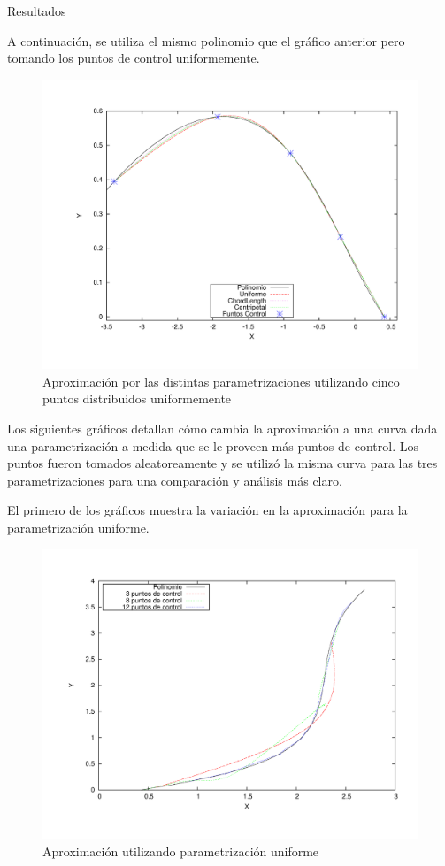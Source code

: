 \begin{section}{Resultados}
	\VSP
	
	A continuación, se utiliza el mismo polinomio que el gráfico anterior pero tomando los puntos de control uniformemente.
	
	\begin{figure}[H]
	  \centering
		\includegraphics[width=14cm]{graficos/5p_u.pdf}
	  \caption{Aproximación por las distintas parametrizaciones utilizando cinco puntos distribuidos uniformemente}
	  \label{fig:5p_u}
	\end{figure}
	
	\VSP

	Los siguientes gráficos detallan cómo cambia la aproximación a una curva dada una parametrización a medida que se le proveen más puntos de control. 
	Los puntos fueron tomados aleatoreamente y se utilizó la misma curva para las tres parametrizaciones para una comparación y análisis más claro.
		
	El primero de los gráficos muestra la variación en la aproximación para la parametrización uniforme.
		
	\begin{figure}[H]
	  \centering
		\includegraphics[width=14cm]{graficos/uniform_grafiquinSame.pdf}
	  \caption{Aproximación utilizando parametrización uniforme}
	  \label{fig:uniform}
	\end{figure}
	

\end{section}
